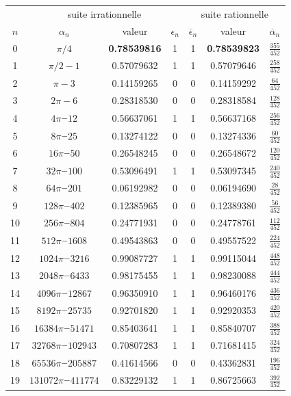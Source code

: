 \documentclass{scrartcl}
\begin{document}
\begin{table}
\begin{tabular}{|*{7}{c|}}
& \multicolumn{3}{|c|}{suite irrationnelle} 
& \multicolumn{3}{|c|}{suite rationnelle} \\
$n$ & $\alpha_n$ & valeur & $\epsilon_n$ & $\overline{\epsilon}_n$ & valeur & $\overline{\alpha}_n$ \\ 
\hline
0 & $\pi/4$ & \textbf{0.78539816} & 1 & 1 & \textbf{0.78539823} & $\frac{355}{452}$ \\
1 & $\pi/2-1$ & 0.57079632 & 1 & 1 & 0.57079646 & $\frac{258}{452}$ \\
2 & $\pi-3$ & 0.14159265 & 0 & 0 & 0.14159292 & $\frac{64}{452}$ \\
3 & $2\pi-6$ & 0.28318530 & 0 & 0 & 0.28318584 & $\frac{128}{452}$ \\
4 & $4\pi‒12$ & 0.56637061 & 1 & 1 & 0.56637168 & $\frac{256}{452}$ \\
5 & $8\pi‒25$ & 0.13274122 & 0 & 0 & 0.13274336 & $\frac{60}{452}$ \\
6 & $16\pi‒50$ & 0.26548245 & 0 & 0 & 0.26548672 & $\frac{120}{452}$ \\
7 & $32\pi‒100$ & 0.53096491 & 1 & 1 & 0.53097345 & $\frac{240}{452}$ \\
8 & $64\pi‒201$ & 0.06192982 & 0 & 0 & 0.06194690 & $\frac{28}{452}$ \\
9 & $128\pi‒402$ & 0.12385965 & 0 & 0 & 0.12389380 & $\frac{56}{452}$ \\
10 & $256\pi‒804$ & 0.24771931 & 0 & 0 & 0.24778761 & $\frac{112}{452}$ \\
11 & $512\pi‒1608$ & 0.49543863 & 0 & 0 & 0.49557522 & $\frac{224}{452}$ \\
12 & $1024\pi‒3216$ & 0.99087727 & 1 & 1 & 0.99115044 & $\frac{448}{452}$ \\
13 & $2048\pi‒6433$ & 0.98175455 & 1 & 1 & 0.98230088 & $\frac{444}{452}$ \\
14 & $4096\pi‒12867$ & 0.96350910 & 1 & 1 & 0.96460176 & $\frac{436}{452}$ \\
15 & $8192\pi‒25735$ & 0.92701820 & 1 & 1 & 0.92920353 & $\frac{420}{452}$ \\
16 & $16384\pi‒51471$ & 0.85403641 & 1 & 1 & 0.85840707 & $\frac{388}{452}$ \\
17 & $32768\pi‒102943$ & 0.70807283 & 1 & 1 & 0.71681415 & $\frac{324}{452}$ \\
18 & $65536\pi‒205887$ & 0.41614566 & 0 & 0 & 0.43362831 & $\frac{196}{452}$ \\
19 & $131072\pi‒411774$ & 0.83229132 & 1 & 1 & 0.86725663 & $\frac{392}{452}$ \\

\end{tabular}
\end{table}
\end{document}
